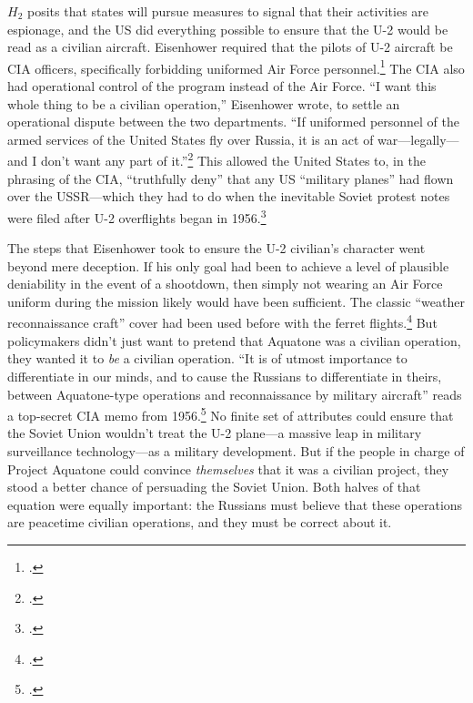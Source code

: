 \documentclass[14pt]{extarticle}
\begin{document}
$H_2$ posits that states will pursue measures to signal that their activities are espionage, and the US did everything possible to ensure that the U-2 would be read as a civilian aircraft. Eisenhower required that the pilots of U-2 aircraft be CIA officers, specifically forbidding uniformed Air Force personnel.\footcite[p.~33, Though many of the pilots did have Air Force backgrounds.]{lindgren_trust_2000} The CIA also had operational control of the program instead of the Air Force. \enquote{I want this whole thing to be a civilian operation,} Eisenhower wrote, to settle an operational dispute between the two departments. \enquote{If uniformed personnel of the armed services of the United States fly over Russia, it is an act of war---legally---and I don't want any part of it.}\footcite[p.~60. The original source for this quote is an \emph{OSA History} that requires codeword clearance. It is quoted here by the History Staff of the CIA.]{pedlow_central_1992} This allowed the United States to, in the phrasing of the CIA, \enquote{truthfully deny} that any US \enquote{military planes} had flown over the USSR---which they had to do when the inevitable Soviet protest notes were filed after U-2 overflights began in 1956.\footcite[p.~109]{pedlow_central_1992}

The steps that Eisenhower took to ensure the U-2 civilian's character went beyond mere deception. If his only goal had been to achieve a level of plausible deniability in the event of a shootdown, then simply not wearing an Air Force uniform during the mission likely would have been sufficient. The classic \enquote{weather reconnaissance craft} cover had been used before with the ferret flights.\footcite[p.~45]{farquhar_aerial_2015} But policymakers didn't just want to pretend that Aquatone was a civilian operation, they wanted it to \emph{be} a civilian operation. \enquote{It is of utmost importance to differentiate in our minds, and to cause the Russians to differentiate in theirs, between Aquatone-type operations and reconnaissance by military aircraft} reads a top-secret CIA memo from 1956.\footcite[p.~1]{miller_suggestions_1956} No finite set of attributes could ensure that the Soviet Union wouldn't treat the U-2 plane---a massive leap in military surveillance technology---as a military development. But if the people in charge of Project Aquatone could convince \emph{themselves} that it was a civilian project, they stood a better chance of persuading the Soviet Union. Both halves of that equation were equally important: the Russians must believe that these operations are peacetime civilian operations, and they must be correct about it.
\end{document}

